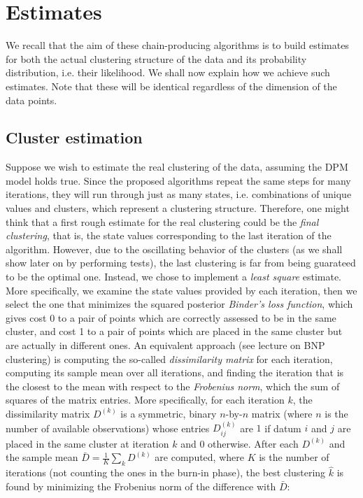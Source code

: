 \chapter{Estimates} \label{chap-esimates-1}
We recall that the aim of these chain-producing algorithms is to build estimates for both the actual clustering structure of the data and its probability distribution, i.e. their likelihood.
We shall now explain how we achieve such estimates.
Note that these will be identical regardless of the dimension of the data points.


\section{Cluster estimation}
Suppose we wish to estimate the real clustering of the data, assuming the DPM model holds true.
Since the proposed algorithms repeat the same steps for many iterations, they will run through just as many states, i.e. combinations of unique values and clusters, which represent a clustering structure.
Therefore, one might think that a first rough estimate for the real clustering could be the \emph{final clustering}, that is, the state values corresponding to the last iteration of the algorithm.
However, due to the oscillating behavior of the clusters (as we shall show later on by performing tests), the last clustering is far from being guarateed to be the optimal one.
Instead, we chose to implement a \emph{least square} estimate.
More specifically, we examine the state values provided by each iteration, then we select the one that minimizes the squared posterior \emph{Binder's loss function}, which gives cost 0 to a pair of points which are correctly assessed to be in the same cluster, and cost 1 to a pair of points which are placed in the same cluster but are actually in different ones.
An equivalent approach (see \cite{beep-bayes} lecture on BNP clustering) is computing the so-called \emph{dissimilarity matrix} for each iteration, computing its sample mean over all iterations, and finding the iteration that is the closest to the mean with respect to the \emph{Frobenius norm}, which the sum of squares of the matrix entries. 
More specifically, for each iteration $k$, the dissimilarity matrix $D^{(k)}$ is a symmetric, binary $n$-by-$n$ matrix (where $n$ is the number of available observations) whose entries $D^{(k)}_{ij}$ are $1$ if datum $i$ and $j$ are placed in the same cluster at iteration $k$ and $0$ otherwise.
After each $D^{(k)}$ and the sample mean $\bar{D} = \frac{1}{K} \sum_k D^{(k)}$ are computed, where $K$ is the number of iterations (not counting the ones in the burn-in phase), the best clustering $\hat{k}$ is found by minimizing the Frobenius norm of the difference with $\bar{D}$:
